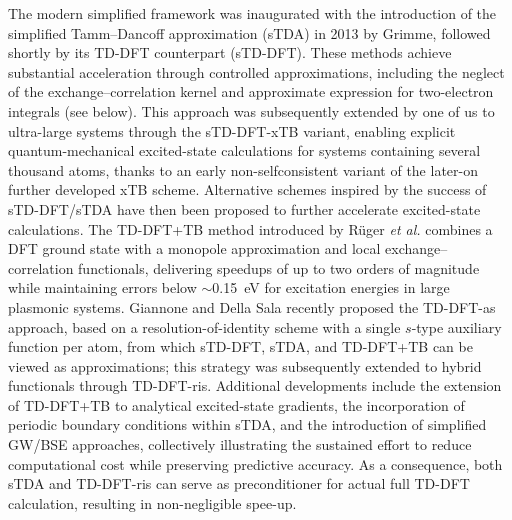 \documentclass[%
 aip,
 amsmath,amssymb,
preprint,%
]{revtex4-2}
\begin{document}
The modern simplified framework was inaugurated with the introduction of the simplified Tamm--Dancoff approximation (sTDA) in 2013 by Grimme,\cite{grimmeSimplifiedTammDancoffDensity2013} followed shortly by its TD-DFT counterpart (sTD-DFT).\cite{bannwarthSimplifiedTimedependentDensity2014}
These methods achieve substantial acceleration through controlled approximations, including the neglect of the exchange--correlation kernel and approximate expression for two-electron integrals (see below).  
This approach was subsequently extended by one of us to ultra-large systems through the sTD-DFT-xTB variant,\cite{grimmeUltrafastComputationElectronic2016} enabling explicit quantum-mechanical excited-state calculations for systems containing several thousand atoms, thanks to an early non-selfconsistent variant of the later-on further developed xTB scheme.  
Alternative schemes inspired by the success of sTD-DFT/sTDA have then been proposed to further accelerate excited-state calculations.
The TD-DFT+TB method introduced by Rüger \emph{et al.}\cite{rugerTightbindingApproximationsTimedependent2016} combines a DFT ground state with a monopole approximation and local exchange--correlation functionals, delivering speedups of up to two orders of magnitude while maintaining errors below $\sim$0.15~eV for excitation energies in large plasmonic systems.
Giannone and Della Sala\cite{giannoneMinimalAuxiliaryBasis2020} recently proposed the TD-DFT-as approach, based on a resolution-of-identity scheme with a single $s$-type auxiliary function per atom, from which sTD-DFT, sTDA, and TD-DFT+TB can be viewed as approximations; this strategy was subsequently extended to hybrid functionals through TD-DFT-ris.\cite{zhouMinimalAuxiliaryBasis2023}
Additional developments include the extension of TD-DFT+TB to analytical excited-state gradients, the incorporation of periodic boundary conditions within sTDA,\cite{hehnExcitedStatePropertiesExtended2022} and the introduction of simplified GW/BSE approaches,\cite{choSimplifiedGWBSE2022} collectively illustrating the sustained effort to reduce computational cost while preserving predictive accuracy.
As a consequence, both sTDA and TD-DFT-ris can serve as preconditioner for actual full TD-DFT calculation, resulting in non-negligible spee-up.\cite{zhouAcceleratingMolecularProperty2021,zhouConvergingTimeDependentDensity2024}
\end{document}
